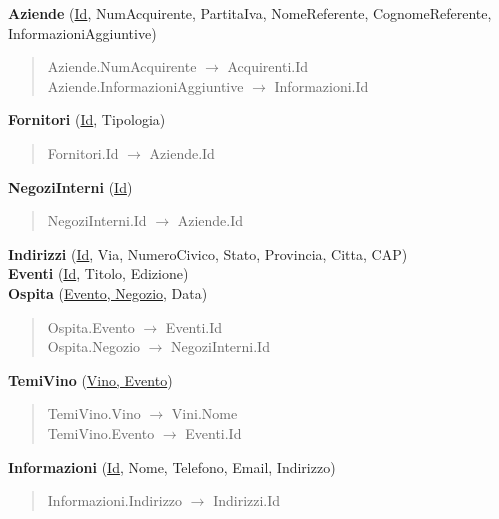 \textbf{Aziende} (\underline{Id}, NumAcquirente, PartitaIva, NomeReferente, CognomeReferente, InformazioniAggiuntive)
\begin{verse}
	Aziende.NumAcquirente $\to$ Acquirenti.Id\\
	Aziende.InformazioniAggiuntive $\to$ Informazioni.Id
\end{verse}
\textbf{Fornitori} (\underline{Id}, Tipologia)
\begin{verse}
	Fornitori.Id $\to$ Aziende.Id
\end{verse} 
\textbf{NegoziInterni} (\underline{Id})
\begin{verse}
	NegoziInterni.Id $\to$ Aziende.Id
\end{verse} 
\textbf{Indirizzi} (\underline{Id}, Via, NumeroCivico, Stato, Provincia, Citta, CAP)\\
\textbf{Eventi} (\underline{Id}, Titolo, Edizione)\\
\textbf{Ospita} (\underline{Evento, Negozio}, Data)
\begin{verse}
	Ospita.Evento $\to$ Eventi.Id\\
	Ospita.Negozio $\to$ NegoziInterni.Id
\end{verse}  
\textbf{TemiVino} (\underline{Vino, Evento})
\begin{verse}
	TemiVino.Vino $\to$ Vini.Nome\\
	TemiVino.Evento $\to$ Eventi.Id
\end{verse}
\textbf{Informazioni} (\underline{Id}, Nome, Telefono, Email, Indirizzo)
\begin{verse}
	Informazioni.Indirizzo $\to$ Indirizzi.Id
\end{verse} 